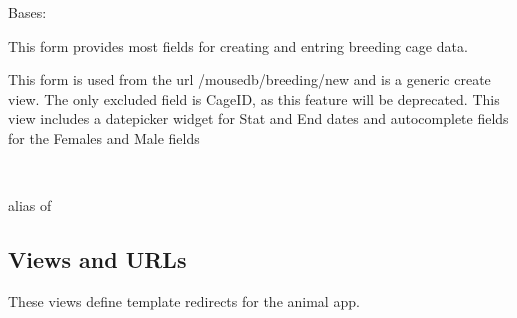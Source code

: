 \documentclass[letterpaper,10pt,english]{sphinxmanual}
\begin{document}
\begin{fulllineitems}
\label{api:animal.forms.BreedingForm}
Bases: 

This form provides most fields for creating and entring breeding cage data.

This form is used from the url /mousedb/breeding/new and is a generic create view.  The only excluded field is CageID, as this feature will be deprecated.  This view includes a datepicker widget for Stat and End dates and autocomplete fields for the Females and Male fields

\begin{fulllineitems}
\label{api:animal.forms.BreedingForm.Media}
\end{fulllineitems}


\begin{fulllineitems}
\label{api:animal.forms.BreedingForm.Meta}~

\begin{fulllineitems}
\label{api:animal.forms.BreedingForm.Meta.model}
alias of 

\end{fulllineitems}


\end{fulllineitems}


\begin{fulllineitems}
\label{api:animal.forms.BreedingForm.media}
\end{fulllineitems}


\end{fulllineitems}



\subsection{Views and URLs}
\label{api:id3}\label{api:module-animal.views}
These views define template redirects for the animal app.
\end{document}
